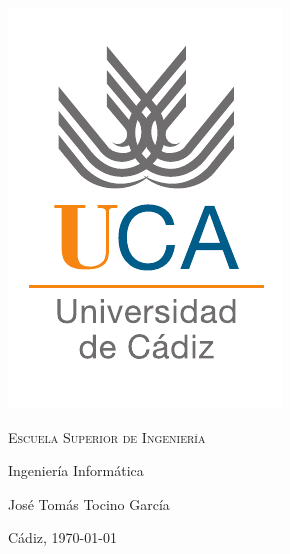 \begin{titlepage}
  \centering
  \includegraphics[width=.3\textwidth]{0_misc/logo_uca}

  \bigskip
  \bigskip
  \bigskip

  \begin{changemargin}{3em}{3em}
    \centering

    {\Huge \textsc{\nohyphens{Escuela Superior de Ingeniería}}}

    \bigskip
    \bigskip
    \bigskip

    {\huge \nohyphens{Ingeniería Informática}}

    \bigskip
    \bigskip
    \bigskip
    \bigskip
    \bigskip
    \bigskip

    \begin{doublespace}
      {\LARGE \nohyphens{\nombreProyecto}}
    \end{doublespace}


    \bigskip
    \bigskip
    \bigskip
    \bigskip

    \bigskip
    \bigskip
    \bigskip
    \bigskip
    \bigskip
    \bigskip
    \bigskip

  \end{changemargin}

  {\Large José Tomás Tocino García \\}

  \bigskip

  {\large Cádiz, \today}

\end{titlepage}

